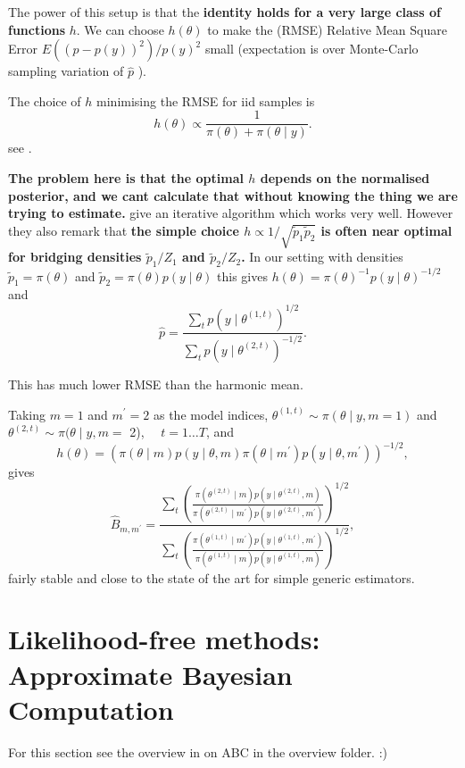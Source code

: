 \documentclass{article}
\begin{document}
The power of this setup is that the \textbf{identity holds for a very large class of functions }$h$. We can choose $h(\theta)$ to make the (RMSE) Relative Mean Square Error $E\left((\hat{p}-p(y))^2\right) / p(y)^2$ small (expectation is over Monte-Carlo sampling variation of $\hat{p}$ ).

The choice of $h$ minimising the RMSE for iid samples is
$$
h(\theta) \propto \frac{1}{\pi(\theta)+\pi(\theta \mid y)} .
$$
see \cite{meng_simulating_1996}.

\textbf{The problem here is that the optimal $h$ depends on the normalised posterior, and we cant calculate that without knowing the thing we are trying to estimate.} \cite{meng_simulating_1996} give an iterative algorithm which works very well. However they also remark that\textbf{ the simple choice $h \propto 1 / \sqrt{\tilde{p}_1 \tilde{p}_2}$ is often near optimal for bridging densities $\tilde{p}_1 / Z_1$ and $\tilde{p}_2 / Z_2$.} In our setting with densities $\tilde{p}_1=\pi(\theta)$ and $\tilde{p}_2=\pi(\theta) p(y \mid \theta)$ this gives $h(\theta)=\pi(\theta)^{-1} p(y \mid \theta)^{-1 / 2}$ and
$$
\hat{p}=\frac{\sum_t p\left(y \mid \theta^{(1, t)}\right)^{1 / 2}}{\sum_t p\left(y \mid \theta^{(2, t)}\right)^{-1 / 2}} .
$$

This has much lower RMSE than the harmonic mean.

Taking $m=1$ and $m^{\prime}=2$ as the model indices, $\theta^{(1, t)} \sim \pi(\theta \mid y, m=1)$ and $\theta^{(2, t)} \sim \pi(\theta \mid y, m=$ 2), $\quad t=1 \ldots T$, and
$$
h(\theta)=\left(\pi(\theta \mid m) p(y \mid \theta, m) \pi\left(\theta \mid m^{\prime}\right) p\left(y \mid \theta, m^{\prime}\right)\right)^{-1 / 2},
$$
gives
$$
\hat{B}_{m, m^{\prime}}=\frac{\sum_t\left(\frac{\pi\left(\theta^{(2, t)} \mid m\right) p\left(y \mid \theta^{(2, t)}, m\right)}{\pi\left(\theta^{(2, t)} \mid m^{\prime}\right) p\left(y \mid \theta^{(2, t)}, m^{\prime}\right)}\right)^{1 / 2}}{\sum_t\left(\frac{\pi\left(\theta^{(1, t)} \mid m^{\prime}\right) p\left(y \mid \theta^{(1, t)}, m^{\prime}\right)}{\pi\left(\theta^{(1, t)} \mid m\right) p\left(y \mid \theta^{(1, t)}, m\right)}\right)^{1 / 2}},
$$
fairly stable and close to the state of the art for simple generic estimators. 

\section{Likelihood-free methods: Approximate Bayesian Computation}
For this section see the overview in on ABC in the overview folder. :) 
\end{document}
